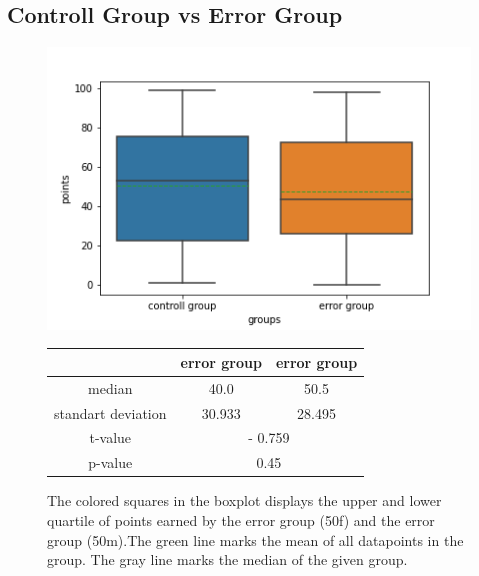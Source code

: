 \documentclass[runningheads]{llncs}
\begin{document}
\subsection{Controll Group vs Error Group}
\begin{figure}
    \begin{minipage}{0.45\textwidth}        
        \includegraphics[width=\textwidth]{code/generate/all.png}
        \caption{The colored squares in the boxplot displays
        the upper and lower quartile of points earned by the error group (50f) and
        the error group (50m).The green line marks the mean of all datapoints in the group.
        The gray line marks the median  of the given group.} \label{fig6}
    \end{minipage}
\hfill
\begin{minipage}{0.45\textwidth}
\begin{tabular}[]{| c | c | c |}
        \hline
        & error group & error group \\
        \hline
        median & 40.0&50.5 \\
        \hline
        standart deviation & 30.933&28.495 \\
        \hline
        t-value & \multicolumn{2}{c|}{- 0.759} \\
        \hline
        p-value & \multicolumn{2}{c|}{0.45} \\
        \hline            
\end{tabular}
\end{minipage}
\end{figure}
\end{document}
